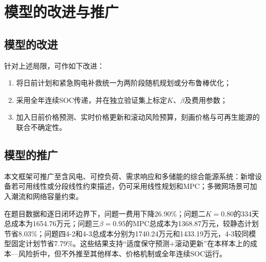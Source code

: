 \documentclass{cumcmthesis}
\begin{document}
\section{模型的改进与推广}

\subsection{模型的改进}

针对上述局限，可作如下改进：
\begin{enumerate}
    \item 将日前计划和紧急购电补救统一为两阶段随机规划或分布鲁棒优化；
    \item 采用全年连续SOC传递，并在独立验证集上标定$K$、$\beta$及费用参数；
    \item 加入日前价格预测、实时价格更新和滚动风险预算，刻画价格与可再生能源的联合不确定性。
\end{enumerate}

\subsection{模型的推广}

本文框架可推广至含风电、可控负荷、需求响应和多储能的综合能源系统：新增设备若可用线性或分段线性约束描述，仍可采用线性规划和MPC；多微网场景可加入潮流和网络容量约束。

在题目数据和逐日闭环边界下，问题一费用下降26.90\%；问题二$K=0.80$的334天总成本为1654.76万元；问题三$\beta=0.95$的MPC总成本为1368.87万元，较静态计划节省8.03\%；问题四4-2和4-3总成本分别为1740.24万元和1433.19万元，4-3较同模型固定计划节省7.79\%。这些结果支持“适度保守预测+滚动更新”在本样本上的成本—风险折中，但不外推至其他样本、价格机制或全年连续SOC运行。
\end{document}

